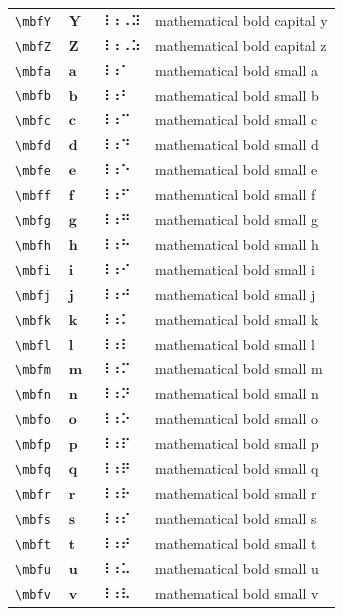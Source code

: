 \documentclass[oneside]{article}
\begin{document}
\begin{longtable}{llll}
\verb|\mbfY| & $\mbfY$ &  ⠸⠰⠠⠽  & {mathematical bold capital y} \\[2ex]
\verb|\mbfZ| & $\mbfZ$ &  ⠸⠰⠠⠵  & {mathematical bold capital z} \\[2ex]
\verb|\mbfa| & $\mbfa$ &  ⠸⠰⠁  & {mathematical bold small a} \\[2ex]
\verb|\mbfb| & $\mbfb$ &  ⠸⠰⠃  & {mathematical bold small b} \\[2ex]
\verb|\mbfc| & $\mbfc$ &  ⠸⠰⠉  & {mathematical bold small c} \\[2ex]
\verb|\mbfd| & $\mbfd$ &  ⠸⠰⠙  & {mathematical bold small d} \\[2ex]
\verb|\mbfe| & $\mbfe$ &  ⠸⠰⠑  & {mathematical bold small e} \\[2ex]
\verb|\mbff| & $\mbff$ &  ⠸⠰⠋  & {mathematical bold small f} \\[2ex]
\verb|\mbfg| & $\mbfg$ &  ⠸⠰⠛  & {mathematical bold small g} \\[2ex]
\verb|\mbfh| & $\mbfh$ &  ⠸⠰⠓  & {mathematical bold small h} \\[2ex]
\verb|\mbfi| & $\mbfi$ &  ⠸⠰⠊  & {mathematical bold small i} \\[2ex]
\verb|\mbfj| & $\mbfj$ &  ⠸⠰⠚  & {mathematical bold small j} \\[2ex]
\verb|\mbfk| & $\mbfk$ &  ⠸⠰⠅  & {mathematical bold small k} \\[2ex]
\verb|\mbfl| & $\mbfl$ &  ⠸⠰⠇  & {mathematical bold small l} \\[2ex]
\verb|\mbfm| & $\mbfm$ &  ⠸⠰⠍  & {mathematical bold small m} \\[2ex]
\verb|\mbfn| & $\mbfn$ &  ⠸⠰⠝  & {mathematical bold small n} \\[2ex]
\verb|\mbfo| & $\mbfo$ &  ⠸⠰⠕  & {mathematical bold small o} \\[2ex]
\verb|\mbfp| & $\mbfp$ &  ⠸⠰⠏  & {mathematical bold small p} \\[2ex]
\verb|\mbfq| & $\mbfq$ &  ⠸⠰⠟  & {mathematical bold small q} \\[2ex]
\verb|\mbfr| & $\mbfr$ &  ⠸⠰⠗  & {mathematical bold small r} \\[2ex]
\verb|\mbfs| & $\mbfs$ &  ⠸⠰⠎  & {mathematical bold small s} \\[2ex]
\verb|\mbft| & $\mbft$ &  ⠸⠰⠞  & {mathematical bold small t} \\[2ex]
\verb|\mbfu| & $\mbfu$ &  ⠸⠰⠥  & {mathematical bold small u} \\[2ex]
\verb|\mbfv| & $\mbfv$ &  ⠸⠰⠧  & {mathematical bold small v} \\[2ex]

\end{longtable}
\end{document}
